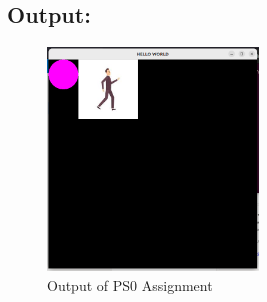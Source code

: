 \subsection{Output:}\label{sec:ps0:output}
\begin{figure}[h]
    \centering
    \includegraphics[width=0.5\textwidth]{ps0/Screenshot.png}
    \caption{Output of PS0 Assignment}
    \label{fig:ps0}
\end{figure}



\newpage
